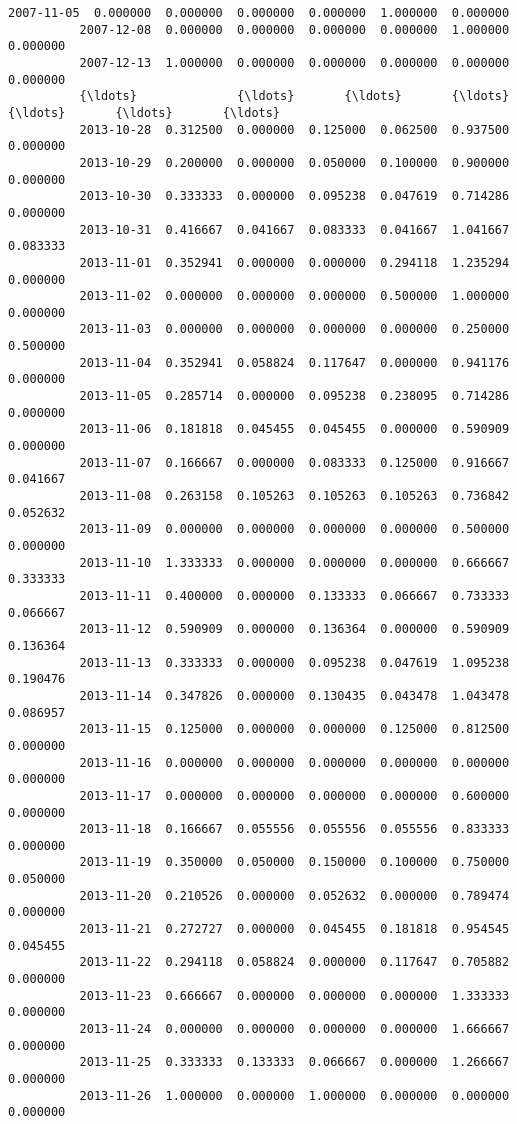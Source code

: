 \documentclass[11pt]{article}
\begin{document}
\begin{Verbatim}[commandchars=\\\{\}]
          2007-11-05  0.000000  0.000000  0.000000  0.000000  1.000000  0.000000   
          2007-12-08  0.000000  0.000000  0.000000  0.000000  1.000000  0.000000   
          2007-12-13  1.000000  0.000000  0.000000  0.000000  0.000000  0.000000   
          {\ldots}              {\ldots}       {\ldots}       {\ldots}       {\ldots}       {\ldots}       {\ldots}   
          2013-10-28  0.312500  0.000000  0.125000  0.062500  0.937500  0.000000   
          2013-10-29  0.200000  0.000000  0.050000  0.100000  0.900000  0.000000   
          2013-10-30  0.333333  0.000000  0.095238  0.047619  0.714286  0.000000   
          2013-10-31  0.416667  0.041667  0.083333  0.041667  1.041667  0.083333   
          2013-11-01  0.352941  0.000000  0.000000  0.294118  1.235294  0.000000   
          2013-11-02  0.000000  0.000000  0.000000  0.500000  1.000000  0.000000   
          2013-11-03  0.000000  0.000000  0.000000  0.000000  0.250000  0.500000   
          2013-11-04  0.352941  0.058824  0.117647  0.000000  0.941176  0.000000   
          2013-11-05  0.285714  0.000000  0.095238  0.238095  0.714286  0.000000   
          2013-11-06  0.181818  0.045455  0.045455  0.000000  0.590909  0.000000   
          2013-11-07  0.166667  0.000000  0.083333  0.125000  0.916667  0.041667   
          2013-11-08  0.263158  0.105263  0.105263  0.105263  0.736842  0.052632   
          2013-11-09  0.000000  0.000000  0.000000  0.000000  0.500000  0.000000   
          2013-11-10  1.333333  0.000000  0.000000  0.000000  0.666667  0.333333   
          2013-11-11  0.400000  0.000000  0.133333  0.066667  0.733333  0.066667   
          2013-11-12  0.590909  0.000000  0.136364  0.000000  0.590909  0.136364   
          2013-11-13  0.333333  0.000000  0.095238  0.047619  1.095238  0.190476   
          2013-11-14  0.347826  0.000000  0.130435  0.043478  1.043478  0.086957   
          2013-11-15  0.125000  0.000000  0.000000  0.125000  0.812500  0.000000   
          2013-11-16  0.000000  0.000000  0.000000  0.000000  0.000000  0.000000   
          2013-11-17  0.000000  0.000000  0.000000  0.000000  0.600000  0.000000   
          2013-11-18  0.166667  0.055556  0.055556  0.055556  0.833333  0.000000   
          2013-11-19  0.350000  0.050000  0.150000  0.100000  0.750000  0.050000   
          2013-11-20  0.210526  0.000000  0.052632  0.000000  0.789474  0.000000   
          2013-11-21  0.272727  0.000000  0.045455  0.181818  0.954545  0.045455   
          2013-11-22  0.294118  0.058824  0.000000  0.117647  0.705882  0.000000   
          2013-11-23  0.666667  0.000000  0.000000  0.000000  1.333333  0.000000   
          2013-11-24  0.000000  0.000000  0.000000  0.000000  1.666667  0.000000   
          2013-11-25  0.333333  0.133333  0.066667  0.000000  1.266667  0.000000   
          2013-11-26  1.000000  0.000000  1.000000  0.000000  0.000000  0.000000   
          

\end{Verbatim}
\end{document}
